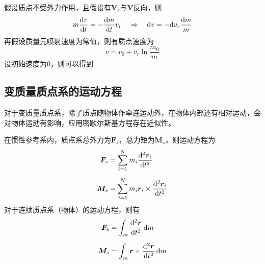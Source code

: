 	假设质点不受外力作用，且假设有$\bm{V}_r$与$\bm{V}$反向，则
	\begin{equation}
		m \dfrac{{\rm{d}} v}{{\rm{d}} t} = - \dfrac{{\rm{d}} m}{{\rm{d}} t} v_r \quad \Rightarrow \quad {\rm{d}} v = - {\rm{d}} v_r \dfrac{{\rm{d}} m}{m}
	\end{equation}
	再假设质量元喷射速度为常值，则有质点速度为
	\begin{equation}
		v = v_0 + v_r \ln \dfrac{m_0}{m}
	\end{equation}
	设初始速度为0，则可以得到
	

\subsection{变质量质点系的运动方程}
	对于变质量质点系，除了质点随物体作牵连运动外，在物体内部还有相对运动，会对物体运动有影响，应用密歇尔斯基方程存在近似性。
	
	在惯性参考系内，质点系总外力为$\bm{F}_s$，总力矩为$\bm{M}_s$，则运动方程为
	\begin{align}
		\bm{F}_s &= \sum_{i=1}^N m_i \dfrac{{\rm{d}}^2 \bm{r}_i}{{\rm{d}} t^2} \\[0.5em]
		\bm{M}_s &= \sum_{i=1}^N m_i\bm{r}_i \times \dfrac{{\rm{d}}^2 \bm{r}_i}{{\rm{d}} t^2} 
	\end{align}
	对于连续质点系（物体）的运动方程，则有
	\begin{align}
		\bm{F}_s &= \int_m \dfrac{{\rm{d}}^2 \bm{r}}{{\rm{d}} t^2} \, {\rm{d}} m \label{相对牛二}\\[0.5em]
		\bm{M}_s &= \int_m \bm{r} \times \dfrac{{\rm{d}}^2 \bm{r}}{{\rm{d}} t^2} \, {\rm{d}} m
	\end{align}

